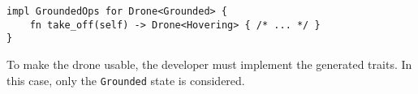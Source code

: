\begin{listing}
    \centering
    \begin{verbatim}
impl GroundedOps for Drone<Grounded> {
    fn take_off(self) -> Drone<Hovering> { /* ... */ }
}
    \end{verbatim}
    \caption{
        To make the drone usable, the developer must implement the generated traits.
        In this case, only the \texttt{Grounded} state is considered.
    }
    \label{lst:dsl-typestate-impl}
\end{listing}